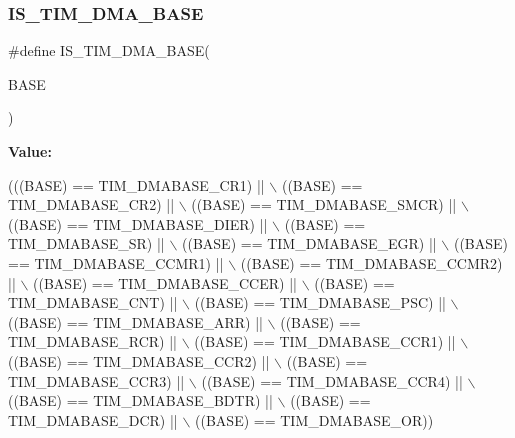 \subsubsection{\texorpdfstring{I\+S\+\_\+\+T\+I\+M\+\_\+\+D\+M\+A\+\_\+\+B\+A\+SE}{IS\_TIM\_DMA\_BASE}}
{\footnotesize\ttfamily \#define I\+S\+\_\+\+T\+I\+M\+\_\+\+D\+M\+A\+\_\+\+B\+A\+SE(\begin{DoxyParamCaption}\item[{}]{B\+A\+SE }\end{DoxyParamCaption})}

{\bfseries Value\+:}
\begin{DoxyCode}
(((BASE) == TIM\_DMABASE\_CR1) || \(\backslash\)
                               ((BASE) == TIM\_DMABASE\_CR2) || \(\backslash\)
                               ((BASE) == TIM\_DMABASE\_SMCR) || \(\backslash\)
                               ((BASE) == TIM\_DMABASE\_DIER) || \(\backslash\)
                               ((BASE) == TIM\_DMABASE\_SR) || \(\backslash\)
                               ((BASE) == TIM\_DMABASE\_EGR) || \(\backslash\)
                               ((BASE) == TIM\_DMABASE\_CCMR1) || \(\backslash\)
                               ((BASE) == TIM\_DMABASE\_CCMR2) || \(\backslash\)
                               ((BASE) == TIM\_DMABASE\_CCER) || \(\backslash\)
                               ((BASE) == TIM\_DMABASE\_CNT) || \(\backslash\)
                               ((BASE) == TIM\_DMABASE\_PSC) || \(\backslash\)
                               ((BASE) == TIM\_DMABASE\_ARR) || \(\backslash\)
                               ((BASE) == TIM\_DMABASE\_RCR) || \(\backslash\)
                               ((BASE) == TIM\_DMABASE\_CCR1) || \(\backslash\)
                               ((BASE) == TIM\_DMABASE\_CCR2) || \(\backslash\)
                               ((BASE) == TIM\_DMABASE\_CCR3) || \(\backslash\)
                               ((BASE) == TIM\_DMABASE\_CCR4) || \(\backslash\)
                               ((BASE) == TIM\_DMABASE\_BDTR) || \(\backslash\)
                               ((BASE) == TIM\_DMABASE\_DCR) || \(\backslash\)
                               ((BASE) == TIM\_DMABASE\_OR))
\end{DoxyCode}
\mbox{\label{group___t_i_m___i_s___t_i_m___definitions_gafd09cf0887b01a15101ba7dd6e2b4ba7}} 
